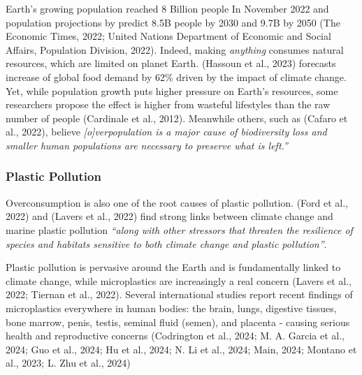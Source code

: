 \documentclass[
  12pt,
  letterpaper,
  DIV=11,
  numbers=noendperiod]{scrartcl}
\begin{document}
\let\pandoctableshortcapt\relax

Earth's growing population reached 8 Billion people In November 2022 and
population projections by predict 8.5B people by 2030 and 9.7B by 2050
(The Economic Times, 2022; United Nations Department of Economic and
Social Affairs, Population Division, 2022). Indeed, making
\emph{anything} consumes natural resources, which are limited on planet
Earth. (Hassoun et al., 2023) forecasts increase of global food demand
by 62\% driven by the impact of climate change. Yet, while population
growth puts higher pressure on Earth's resources, some researchers
propose the effect is higher from wasteful lifestyles than the raw
number of people (Cardinale et al., 2012). Meanwhile others, such as
(Cafaro et al., 2022), believe \emph{{[}o{]}verpopulation is a major
cause of biodiversity loss and smaller human populations are necessary
to preserve what is left.''}

\subsubsection{Plastic Pollution}\label{plastic-pollution}

Overconsumption is also one of the root causes of plastic pollution.
(Ford et al., 2022) and (Lavers et al., 2022) find strong links between
climate change and marine plastic pollution \emph{``along with other
stressors that threaten the resilience of species and habitats sensitive
to both climate change and plastic pollution''}.

Plastic pollution is pervasive around the Earth and is fundamentally
linked to climate change, while microplastics are increasingly a real
concern (Lavers et al., 2022; Tiernan et al., 2022). Several
international studies report recent findings of microplastics everywhere
in human bodies: the brain, lungs, digestive tissues, bone marrow,
penis, testis, seminal fluid (semen), and placenta - causing serious
health and reproductive concerns (Codrington et al., 2024; M. A. Garcia
et al., 2024; Guo et al., 2024; Hu et al., 2024; N. Li et al., 2024;
Main, 2024; Montano et al., 2023; L. Zhu et al., 2024)
\end{document}

